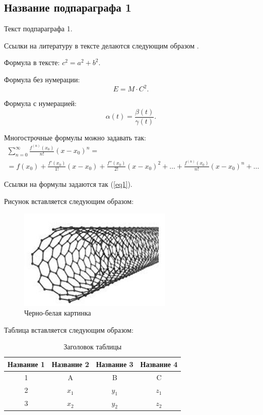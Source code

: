 \documentclass{nsart_eng}
\begin{document}
\subsection{Название подпараграфа 1}

Текст подпараграфа 1.

Ссылки на литературу в тексте делаются следующим образом
\cite{1,4}.

Формула в тексте: $c^2=a^2+b^2$.

Формула без нумерации:
$$
E=M \cdot C^2.
$$

Формула с нумерацией:
\begin{equation} \label{eq1}
\alpha (t) = \frac{ \beta (t)}{\gamma (t)}.
\end{equation}

Многострочные формулы можно задавать так:
\begin{multline} \label{eq2}
\sum\limits_{n=0}^\infty  {\frac{{f^{\left( n \right)} \left( {x_0 } \right)}}{{n!}}\left( {x - x_0 } \right)^n }  = \\
= f\left( {x_0 } \right) + \frac{{f'\left( {x_0 }
\right)}}{{1!}}\left( {x - x_0 } \right) +
 \frac{{f''\left( {x_0 } \right)}}{{2!}}\left( {x - x_0 } \right)^2 + \dots +
 \frac{{f^{\left( n \right)} \left( {x_0 } \right)}}{{n!}}\left( {x - x_0 } \right)^n  + \dots
\end{multline}

Ссылки на формулы задаются так  (\ref{eq1}).

Рисунок вставляется следующим образом:


\begin{figure}
\includegraphics{fig1.png}
\caption{Черно-белая картинка}
\end{figure}




Таблица вставляется следующим образом:
\begin{table}[htbp]
\caption{Заголовок таблицы}
\begin{tabular}
{|c||c|c|c|} \hline Название 1 & Название 2 & Название 3 & Название 4\\
\hline \hline 1 & A & B & C \\ \hline 2 & $x_1$ & $y_1$ & $z_1$ \\
\hline 3 & $x_2$ & $y_2$ & $z_2$ \\ \hline
\end{tabular}
\end{table}
\end{document}

